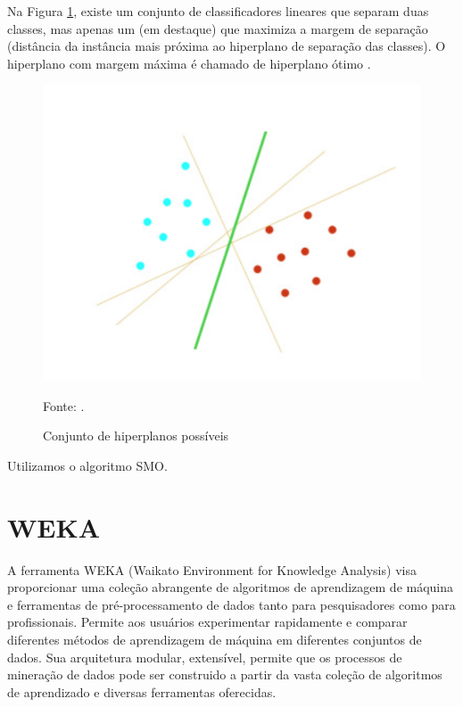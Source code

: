 \documentclass[
	12pt,				%
	openright,			%
	oneside,	
	a4paper,				%
	english,				%
	brazil				%
]{abntex2/abntex2} %
\begin{document}
	Na Figura \ref{figsvmHiperPlanos}, existe um conjunto de classificadores lineares que separam duas classes, mas apenas um (em destaque) que maximiza a margem de separação (distância da instância mais próxima ao hiperplano de separação das classes). O hiperplano com margem máxima é chamado de hiperplano ótimo \cite{junior:2010}.
	\\
	\begin{figure}[!htb]
		\caption{\label{figsvmHiperPlanos} Conjunto de hiperplanos possíveis}
		\begin{center}
			\includegraphics[scale=0.5]{img/svmHiperPlanos.png}
		\end{center}
		Fonte: \cite{junior:2010}.
	\end{figure}
	
	Utilizamos o algoritmo SMO.


	\section{WEKA}
	
	A ferramenta WEKA (Waikato Environment for Knowledge Analysis)  \cite{hall:2009} visa proporcionar uma coleção abrangente de algoritmos de aprendizagem de máquina e ferramentas de pré-processamento de dados tanto para pesquisadores como para profissionais. Permite aos usuários experimentar rapidamente e comparar diferentes métodos de aprendizagem de máquina em diferentes conjuntos de dados. Sua arquitetura modular, extensível, permite que os processos de mineração de dados pode ser construido a partir da vasta coleção de algoritmos de aprendizado e diversas ferramentas oferecidas.
\end{document}
